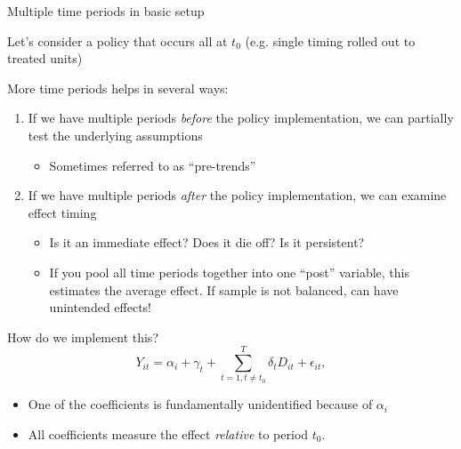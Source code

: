 \documentclass[notes,11pt, aspectratio=169]{beamer}
\newenvironment{wideitemize}{\itemize\addtolength{\itemsep}{10pt}}{\enditemize}
\begin{document}
\begin{frame}{Multiple time periods in basic setup}
  \begin{wideitemize}
  \item Let's consider a policy that occurs all at $t_{0}$
    (e.g. single timing rolled out to treated units)
  \item  More time periods helps in several ways:
    \begin{enumerate}
    \item If we have multiple periods \emph{before} the policy implementation, we can partially test the underlying assumptions
      \begin{itemize}
      \item Sometimes referred to as ``pre-trends''
      \end{itemize}
    \item If we have multiple periods \emph{after} the policy implementation, we can examine effect timing
      \begin{itemize}
      \item Is it an immediate effect? Does it die off? Is it persistent?
      \item If you pool all time periods together into one ``post'' variable, this estimates the average effect. If sample is not balanced, can have unintended effects!
      \end{itemize}
    \end{enumerate}
  \item  How do we implement this? 
    \begin{equation*}
      Y_{it} = \alpha_{i} + \gamma_{t} + \sum_{t=1, t\not=t_{0}}^{T}\delta_{t} D_{it} + \epsilon_{it},
    \end{equation*}
    \begin{itemize}
    \item One of the coefficients is fundamentally unidentified
      because of $\alpha_{i}$
    \item All coefficients measure the effect \emph{relative} to period $t_{0}$.
      \end{itemize}
  \end{wideitemize}
\end{frame}
\end{document}
